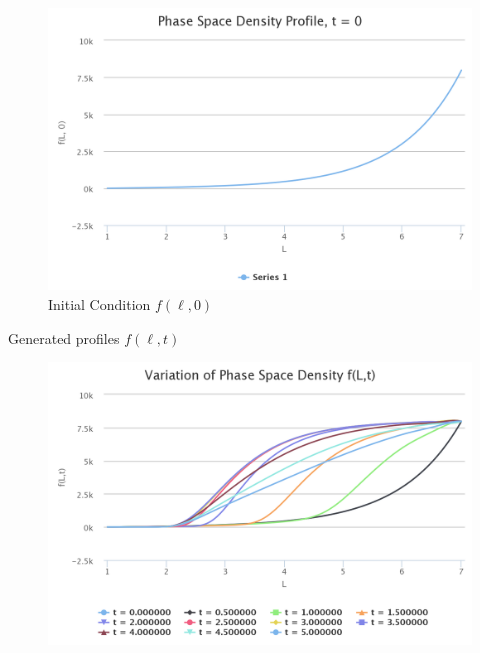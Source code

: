 \documentclass{beamer}
\begin{document}
\begin{frame}
  \begin{figure}[h]
  \includegraphics[width=\textwidth]{initial_psd.png}
  \caption{Initial Condition $f(\ell, 0)$}
  \label{fig:initialPSD}
\end{figure}
\end{frame}

\begin{frame}{Generated profiles $f(\ell, t)$}
  \begin{figure}[h]
  \includegraphics[width=\textwidth]{psdl_ex1.png}
\end{figure}
\end{frame}
\end{document}
